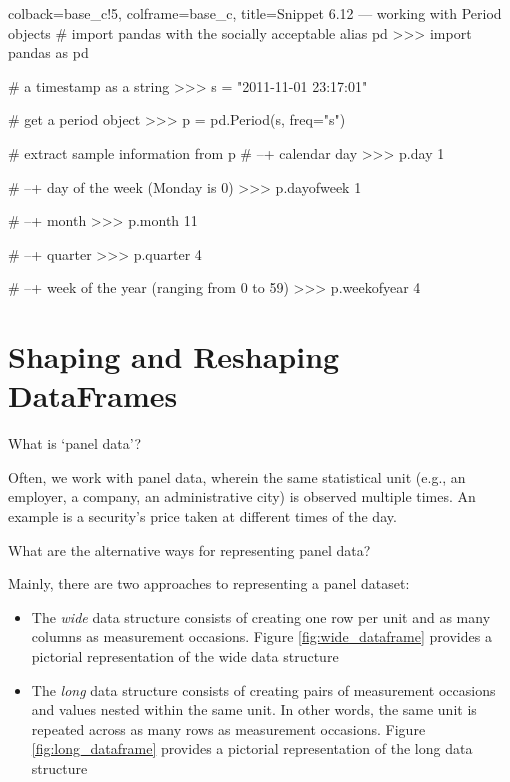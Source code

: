 \documentclass[a4paper,11pt]{book}
\newcommand{\question}[1]{%
    \begin{tcolorbox}[colback=comp_c!10,colframe=comp_c,sidebyside align=top,width=\linewidth,before skip=1ex]
        #1
    \end{tcolorbox}
    \switchcolumn%
}
\newcommand{\note}[1]{%
    \begin{tcolorbox}[colback=white!0,colframe=white!10,width=\linewidth,before skip=1ex]
        #1
    \end{tcolorbox}
}
\begin{document}
\begin{pythoncode}[linenos=True]{colback=base_c!5, colframe=base_c, title=\sffamily Snippet 6.12 --- working with Period objects}
# import pandas with the socially acceptable alias pd
>>> import pandas as pd

# a timestamp as a string 
>>> s = "2011-11-01 23:17:01"

# get a period object 
>>> p = pd.Period(s, freq="s")

# extract sample information from p 
# --+ calendar day
>>> p.day
1

# --+ day of the week (Monday is 0)
>>> p.dayofweek
1 

# --+ month 
>>> p.month
11

# --+ quarter 
>>> p.quarter
4

# --+ week of the year (ranging from 0 to 59)
>>> p.weekofyear
4

\end{pythoncode}

\section{Shaping and Reshaping DataFrames}
\label{sec:wide_long}

\begin{paracol}{2}
	\question{
		\raggedright What is `panel data'?
	}
	\note{
		Often, we work with panel data, wherein the same statistical unit (e.g., an employer, a company, an administrative city) is observed multiple times. An example is a security's price taken at different times of the day.
	}
\end{paracol}

\begin{paracol}{2}
	\question{
		\raggedright What are the alternative ways for representing panel data?
	}
	\note{
		Mainly, there are two approaches to representing a panel dataset:

		\begin{itemize}
			\item The \textit{wide} data structure consists of creating one row per unit and as many columns as measurement occasions. Figure \ref{fig:wide_dataframe} provides a pictorial representation of the wide data structure
			\item The \textit{long} data structure consists of creating pairs of measurement occasions and values nested within the same unit. In other words, the same unit is repeated across as many rows as measurement occasions. Figure \ref{fig:long_dataframe} provides a pictorial representation of the long data structure
		\end{itemize}
	}
\end{paracol}
\end{document}
